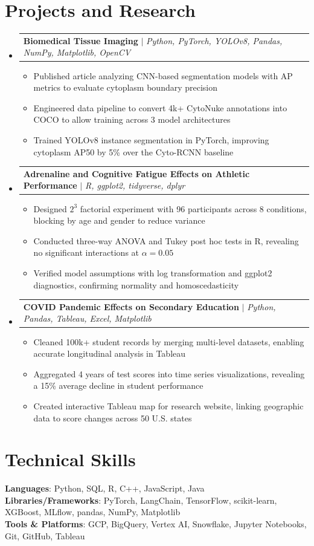 \documentclass[letterpaper,11pt]{article}
\makeatletter
\newcommand{\resumeItem}[1]{
  \item\small{#1}
}
\newcommand{\resumeProjectHeading}[2]{
    \item
    \begin{tabular*}{\textwidth}{l@{\extracolsep{\fill}}r}
      #1 & #2 \\
    \end{tabular*}\vspace{-7pt}
}
\newcommand{\resumeSubHeadingListStart}{\begin{itemize}[leftmargin=0in, label={}]}
\newcommand{\resumeSubHeadingListEnd}{\end{itemize}}
\newcommand{\resumeItemListStart}{\begin{itemize}[itemsep= 1.5pt, parsep=0pt]}
\newcommand{\resumeItemListEnd}{\end{itemize}\vspace{-5pt}}
\makeatother
\begin{document}
\section{Projects and Research}
    \resumeSubHeadingListStart
      \resumeProjectHeading
          {\textbf{Biomedical Tissue Imaging} $|$ \textit{Python, PyTorch, YOLOv8, Pandas, NumPy, Matplotlib, OpenCV}}{}
          \resumeItemListStart
            \resumeItem{Published article analyzing CNN-based segmentation models with AP metrics to evaluate cytoplasm boundary precision}
            \resumeItem{Engineered data pipeline to convert 4k+ CytoNuke annotations into COCO to allow training across 3 model architectures}
            \resumeItem{Trained YOLOv8 instance segmentation in PyTorch, improving cytoplasm AP50 by 5\% over the Cyto-RCNN baseline}
          \resumeItemListEnd
      \resumeProjectHeading
          {\textbf{Adrenaline and Cognitive Fatigue Effects on Athletic Performance} $|$ \textit{R, ggplot2, tidyverse, dplyr}}{}
          \resumeItemListStart
            \resumeItem{Designed $2^3$ factorial experiment with 96 participants across 8 conditions, blocking by age and gender to reduce variance}
            \resumeItem{Conducted three-way ANOVA and Tukey post hoc tests in R, revealing no significant interactions at $\alpha = 0.05$}
            \resumeItem{Verified model assumptions with log transformation and ggplot2 diagnostics, confirming normality and homoscedasticity}
          \resumeItemListEnd
      \resumeProjectHeading
          {\textbf{COVID Pandemic Effects on Secondary Education} $|$ \textit{Python, Pandas, Tableau, Excel, Matplotlib}}{}
          \resumeItemListStart
            \resumeItem{Cleaned 100k+ student records by merging multi-level datasets, enabling accurate longitudinal analysis in Tableau}
            \resumeItem{Aggregated 4 years of test scores into time series visualizations, revealing a 15\% average decline in student performance}
            \resumeItem{Created interactive Tableau map for research website, linking geographic data to score changes across 50 U.S. states}
          \resumeItemListEnd
    \resumeSubHeadingListEnd
\section{Technical Skills}
 \begin{itemize}[leftmargin=0in, label={}]
    \small{\item{
     \textbf{Languages}{: Python, SQL, R, C++, JavaScript, Java} \\
     \textbf{Libraries/Frameworks}{: PyTorch, LangChain, TensorFlow, scikit-learn, XGBoost, MLflow, pandas, NumPy, Matplotlib} \\
     \textbf{Tools \& Platforms}{: GCP, BigQuery, Vertex AI, Snowflake, Jupyter Notebooks, Git, GitHub, Tableau}
    }}
 \end{itemize}
\end{document}
